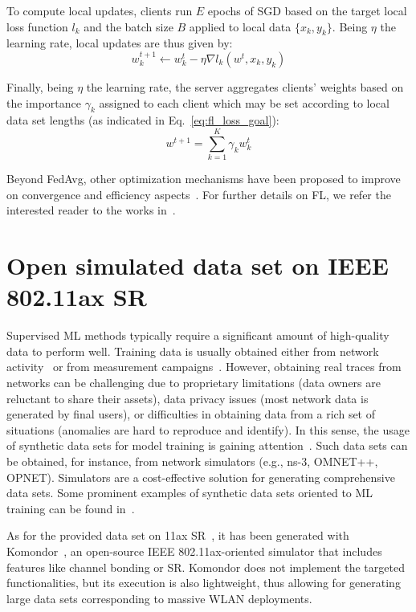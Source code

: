 \documentclass[10pt,a4paper,twocolumn]{article}
\newcommand{\ITUpar}{\vspace{8pt}\par}
\begin{document}
To compute local updates, clients run $E$ epochs of SGD based on the target local loss function $l_k$ and the batch size $B$ applied to local data $\{x_k,y_k\}$. Being $\eta$ the learning rate, local updates are thus given by:
\begin{equation}
	w_k^{t+1} \leftarrow w_k^t - \eta \nabla l_k(w^t,x_k,y_k)
	\label{eq:fl_local_update}
\end{equation}

Finally, being $\eta$ the learning rate, the server aggregates clients' weights based on the importance $\gamma_k$ assigned to each client which may be set according to local data set lengths (as indicated in Eq.~\eqref{eq:fl_loss_goal}):
\begin{equation}
	w^{t+1} = \sum_{k=1}^{K} \gamma_k w_k^t  
	\label{eq:fl_aggregation}
\end{equation}
 
Beyond FedAvg, other optimization mechanisms have been proposed to improve on convergence and efficiency aspects~\cite{reddi2020adaptive}. For further details on FL, we refer the interested reader to the works in~\cite{zhang2021survey, li2020federated}.\ITUpar

\section{Open simulated data set on IEEE 802.11ax SR}
\label{section:dataset}

Supervised ML methods typically require a significant amount of high-quality data to perform well. Training data is usually obtained either from network activity~\cite{turkcelldataset} or from measurement campaigns~\cite{barrachina2021wifi}. However, obtaining real traces from networks can be challenging due to proprietary limitations (data owners are reluctant to share their assets), data privacy issues (most network data is generated by final users), or difficulties in obtaining data from a rich set of situations (anomalies are hard to reproduce and identify). In this sense, the usage of synthetic data sets for model training is gaining attention~\cite{wilhelmi2021usage}. Such data sets can be obtained, for instance, from network simulators (e.g., ns-3, OMNET++, OPNET). Simulators are a cost-effective solution for generating comprehensive data sets. Some prominent examples of synthetic data sets oriented to ML training can be found in~\cite{suarez2021graph, dataset2020}.\ITUpar

As for the provided data set on 11ax SR~\cite{dataset}, it has been generated with Komondor~\cite{bib8}, an open-source IEEE 802.11ax-oriented simulator that includes features like channel bonding or SR. Komondor does not implement the targeted functionalities, but its execution is also lightweight, thus allowing for generating large data sets corresponding to massive WLAN deployments.\ITUpar
\end{document}
